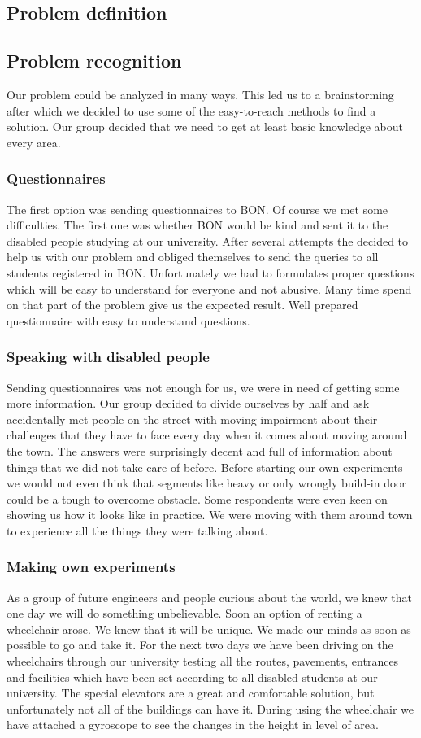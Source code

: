 \documentclass[12pt]{article}
\begin{document}
\subsection{Problem definition}

\subsection{Problem recognition}
Our problem could be analyzed in many ways. This led us to a brainstorming after which we decided to use some of the easy-to-reach methods to find a solution. Our group decided that we need to get at least basic knowledge about every area. 
\subsubsection{Questionnaires}
The first option was sending questionnaires to BON. Of course we met some difficulties. The first one was whether BON would be kind and sent it to the disabled people studying at our university. After several attempts the decided to help us with our problem and obliged themselves to send the queries to all students registered in BON. Unfortunately we had to formulates proper questions which will be easy to understand for everyone and not abusive. Many time spend on that part of the problem give us the expected result. Well prepared questionnaire with easy to understand questions. 
\subsubsection{Speaking with disabled people}
Sending questionnaires was not enough for us, we were in need of getting some more information. Our group decided to divide ourselves by half and ask accidentally met people on the street with moving impairment about their challenges that they have to face every day when it comes about moving around the town. The answers were surprisingly decent and full of information about things that we did not take care of before. Before starting our own experiments we would not even think that segments like heavy or only wrongly build-in door could be a tough to overcome obstacle. Some respondents were even keen on showing us how it looks like in practice. We were moving with them around town to experience all the things they were talking about. 
\subsubsection{Making own experiments}
As a group of future engineers and people curious about the world, we knew that one day we will do something unbelievable. Soon an option of renting a wheelchair arose. We knew that it will be unique. We made our minds as soon as possible to go and take it. For the next two days we have been driving on the wheelchairs through our university testing all the routes, pavements, entrances and facilities which have been set according to all disabled students at our university. The special elevators are a great and comfortable solution, but unfortunately not all of the buildings can have it. During using the wheelchair we have attached a gyroscope to see the changes in the height in level of area.   
\end{document}
